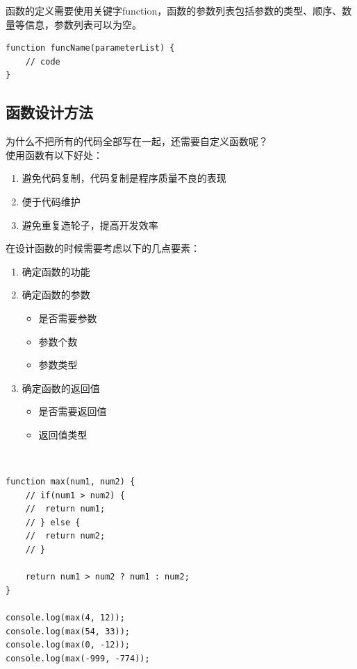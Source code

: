 函数的定义需要使用关键字function，函数的参数列表包括参数的类型、顺序、数量等信息，参数列表可以为空。\\

\begin{lstlisting}[style=htmlcssjs]
function funcName(parameterList) {
    // code
}
\end{lstlisting}

\vspace{0.5cm}

\subsection{函数设计方法}

为什么不把所有的代码全部写在一起，还需要自定义函数呢？\\

使用函数有以下好处：

\begin{enumerate}
	\item 避免代码复制，代码复制是程序质量不良的表现
	\item 便于代码维护
	\item 避免重复造轮子，提高开发效率
\end{enumerate}

在设计函数的时候需要考虑以下的几点要素：

\begin{enumerate}
	\item 确定函数的功能

	\item 确定函数的参数
	      \begin{itemize}
		      \item 是否需要参数
		      \item 参数个数
		      \item 参数类型
	      \end{itemize}

	\item 确定函数的返回值
	      \begin{itemize}
		      \item 是否需要返回值
		      \item 返回值类型
	      \end{itemize}
\end{enumerate}

\\

\begin{lstlisting}[style=htmlcssjs]
function max(num1, num2) {
    // if(num1 > num2) {
    //  return num1;
    // } else {
    //  return num2;
    // }

    return num1 > num2 ? num1 : num2;
}

console.log(max(4, 12));
console.log(max(54, 33));
console.log(max(0, -12));
console.log(max(-999, -774));
\end{lstlisting}

